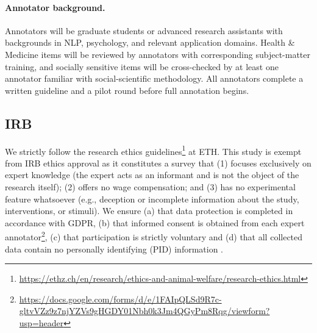 \paragraph{Annotator background.}
Annotators will be graduate students or advanced research assistants with backgrounds in NLP, psychology, and relevant application domains. Health \& Medicine items will be reviewed by annotators with corresponding subject-matter training, and socially sensitive items will be cross-checked by at least one annotator familiar with social-scientific methodology. All annotators complete a written guideline and a pilot round before full annotation begins.


\subsection{IRB}
We strictly follow the research ethics guidelines\footnote{\url{https://ethz.ch/en/research/ethics-and-animal-welfare/research-ethics.html}} at ETH.
This study is exempt from IRB ethics approval as it constitutes a survey that (1) focuses exclusively on expert knowledge (the expert acts as an informant and is not the object of the research itself); (2) offers no wage compensation; and (3) has no experimental feature whatsoever (e.g., deception or incomplete information about the study, interventions, or stimuli). We ensure (a) that data protection is completed in accordance with GDPR, (b) that informed consent is obtained from each expert annotator\footnote{\url{https://docs.google.com/forms/d/e/1FAIpQLSd9R7c-gltvVZz9z7njYZVs9gHGDY01Nbh0k3Jm4QGyPm8Rqg/viewform?usp=header}}, (c) that participation is strictly voluntary and (d) that all collected data contain no personally identifying (PID) information .



